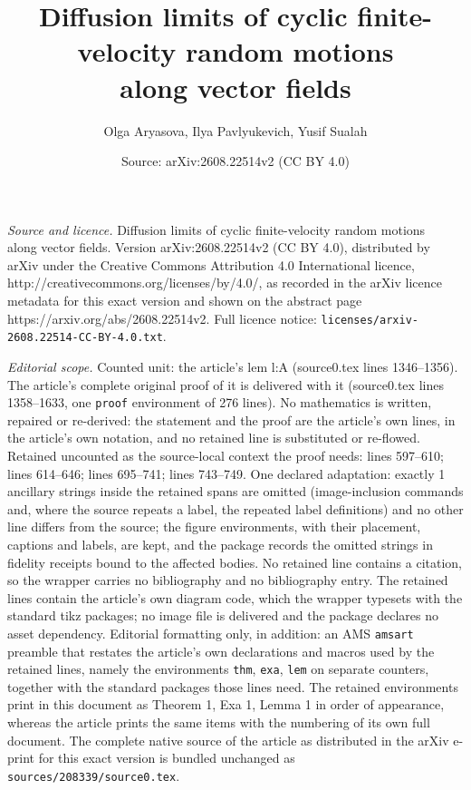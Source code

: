 \documentclass[10pt,a4paper]{amsart}
\title{Diffusion limits of cyclic finite-velocity random motions\\ along vector fields}
\author{Olga Aryasova, Ilya Pavlyukevich, Yusif Sualah}
\date{Source: arXiv:2608.22514v2 (CC BY 4.0)}
\begin{document}
\maketitle

\noindent\emph{Source and licence.} Diffusion limits of cyclic finite-velocity random motions\\ along vector fields. Version arXiv:2608.22514v2 (CC BY 4.0), distributed by arXiv under the Creative Commons Attribution 4.0 International licence, http://creativecommons.org/licenses/by/4.0/, as recorded in the arXiv licence metadata for this exact version and shown on the abstract page https://arxiv.org/abs/2608.22514v2. Full licence notice: \texttt{licenses/arxiv-2608.22514-CC-BY-4.0.txt}.\par\smallskip

\noindent\textit{Editorial scope.} Counted unit: the article's lem l:A (source0.tex lines 1346--1356). The article's complete original proof of it is delivered with it (source0.tex lines 1358--1633, one \texttt{proof} environment of 276 lines). No mathematics is written, repaired or re-derived: the statement and the proof are the article's own lines, in the article's own notation, and no retained line is substituted or re-flowed.  Retained uncounted as the source-local context the proof needs: lines 597--610; lines 614--646; lines 695--741; lines 743--749.  One declared adaptation: exactly 1 ancillary strings inside the retained spans are omitted (image-inclusion commands and, where the source repeats a label, the repeated label definitions) and no other line differs from the source; the figure environments, with their placement, captions and labels, are kept, and the package records the omitted strings in fidelity receipts bound to the affected bodies.  No retained line contains a citation, so the wrapper carries no bibliography and no bibliography entry.  The retained lines contain the article's own diagram code, which the wrapper typesets with the standard tikz packages; no image file is delivered and the package declares no asset dependency.  Editorial formatting only, in addition: an AMS \texttt{amsart} preamble that restates the article's own declarations and macros used by the retained lines, namely the environments \texttt{thm}, \texttt{exa}, \texttt{lem} on separate counters, together with the standard packages those lines need.  The retained environments print in this document as Theorem 1, Exa 1, Lemma 1 in order of appearance, whereas the article prints the same items with the numbering of its own full document.  The complete native source of the article as distributed in the arXiv e-print for this exact version is bundled unchanged as \texttt{sources/208339/source0.tex}.
\end{document}
